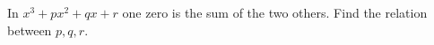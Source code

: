 In $x^3 + px^2 + qx + r$ one zero is the sum of the two others. Find the relation between $p, q, r$.
